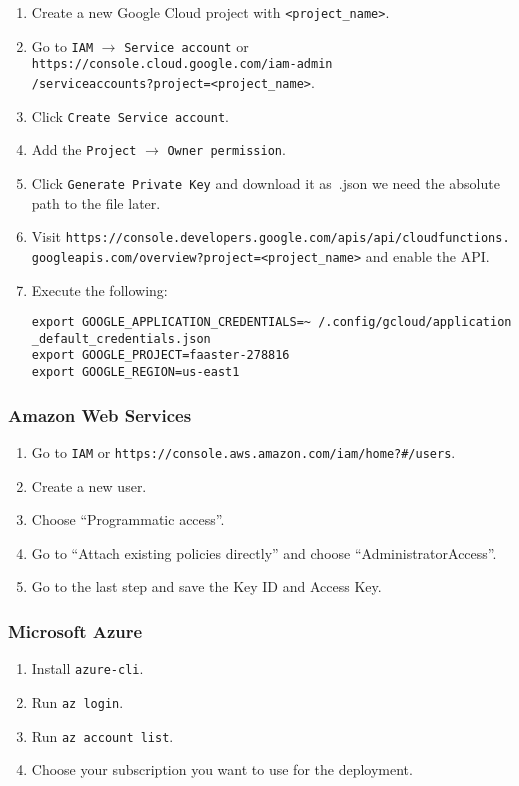 \documentclass[../main.tex]{subfiles}
\begin{document}
\begin{enumerate}
\item Create a new Google Cloud project with \texttt{<project\_name>}.
\item Go to \texttt{IAM} $\rightarrow$ \texttt{Service account} or \texttt{https://console.cloud.google.com/iam-admin\\
  /serviceaccounts?project=<project\_name>}.
\item Click \texttt{Create Service account}.
\item Add the \texttt{Project} $\rightarrow$ \texttt{Owner permission}. %
\item Click \texttt{Generate Private Key} and download it as~.json we need the absolute path to the file later.
\item Visit \texttt{https://console.developers.google.com/apis/api/cloudfunctions.\\
  googleapis.com/overview?project=<project\_name>} and enable the API.\@
\item Execute the following: 
  \begin{tcolorbox}
    \texttt{export GOOGLE\_APPLICATION\_CREDENTIALS={\selectfont\textasciitilde}%
    /.config/gcloud/application\\
    \_default\_credentials.json}\\
    \texttt{export GOOGLE\_PROJECT=faaster-278816}\\
    \texttt{export GOOGLE\_REGION=us-east1}
  \end{tcolorbox}
\end{enumerate}

\subsubsection{Amazon Web Services}\label{sec:providersetupaws}
\begin{enumerate}
\item Go to \texttt{IAM} or \texttt{https://console.aws.amazon.com/iam/home?\#/users}.
\item Create a new user.
\item Choose ``Programmatic access''.
\item Go to ``Attach existing policies directly'' and choose ``AdministratorAccess''.
\item Go to the last step and save the Key ID and Access Key.
\end{enumerate}

\subsubsection{Microsoft Azure}\label{sec:providersetupazure}
\begin{enumerate}
\item Install \texttt{azure-cli}.
\item Run \texttt{az login}.
\item Run \texttt{az account list}.
\item Choose your subscription you want to use for the deployment.
\end{enumerate}
\end{document}
